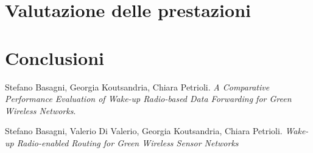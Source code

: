 \documentclass[binding=0.6cm,TFA]{sapthesis}
\begin{document}
\chapter{Valutazione delle prestazioni}
\chapter{Conclusioni}

\backmatter
\cleardoublepage
{} %

\begin{thebibliography}{9}

    Stefano Basagni, Georgia Koutsandria, Chiara Petrioli.
    \textit{A Comparative Performance Evaluation of Wake-up Radio-based Data Forwarding for Green Wireless Networks}.

    Stefano Basagni, Valerio Di Valerio, Georgia Koutsandria, Chiara Petrioli.
    \textit{Wake-up Radio-enabled Routing for Green Wireless Sensor Networks}
\end{thebibliography}
\end{document}
